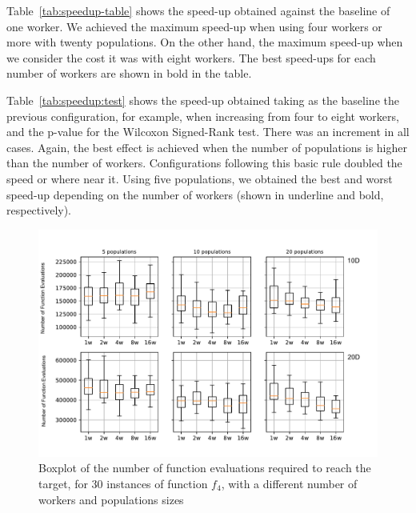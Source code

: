 \documentclass[review]{elsarticle}
\begin{document}
Table~\ref{tab:speedup-table} shows the speed-up obtained against the baseline of
one worker. We achieved the maximum speed-up when using four workers or more with
twenty populations. On the other hand, the maximum speed-up when we consider the
cost it was with eight workers. The best speed-ups for each number of workers are
shown in bold in the table.  



Table~\ref{tab:speedup:test} shows the speed-up obtained taking as the baseline
the previous configuration, for example, when increasing from four to eight
workers, and the p-value for the Wilcoxon Signed-Rank test. There was an
increment in all cases. Again, the best effect is achieved when the number of
populations is higher than the number of workers. Configurations following this
basic rule doubled the speed or where near it. Using five populations, we
obtained the best and worst speed-up depending on the number of workers (shown in
underline and bold, respectively).




\begin{figure}[h!tbp]
  \centering
  \includegraphics[width=\textwidth]{evals_per_instance}
  \caption{Boxplot of the number of function evaluations required to reach the target, for 30 instances of function $f_4$, with a different number of workers and populations sizes}
  \label{fig:evals_instance}
\end{figure}




\end{document}
